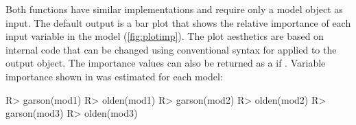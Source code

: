 \documentclass[article,shortnames]{jss}
\begin{document}
Both functions have similar implementations and require only a model object as input.  The default output is a  bar plot \citep[i.e., ,][]{Wickham09} that shows the relative importance of each input variable in the model (\cref{fig:plotimp}).  The plot aesthetics are based on internal code that can be changed using conventional syntax for  applied to the output object.  The importance values can also be returned as a  if .  Variable importance shown in  was estimated for each model:
\begin{Schunk}
\begin{Sinput}
R> garson(mod1)
R> olden(mod1)
R> garson(mod2)
R> olden(mod2)
R> garson(mod3)
R> olden(mod3)
\end{Sinput}
\end{Schunk}
\end{document}
